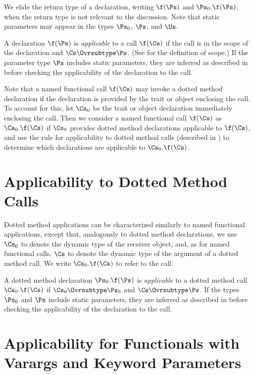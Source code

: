 We elide the return type of a declaration, writing $\f(\Ps)$ and
$\Ps_0.\f(\Ps)$, when the return type is not relevant to the
discussion.
Note that static parameters may appear in the types $\Ps_0$, $\Ps$, and $\Us$.


A declaration $\f(\Ps)$ is \emph{applicable} to a call $\f(\Cs)$
if the call is in the scope of the declaration and $\Cs \Ovrsubtype \Ps$.
(See  for the definition of scope.)
If the parameter type $\Ps$ includes static parameters,
they are inferred as described in 
before checking the applicability of the declaration to the call.



Note that a named functional call $\f(\Cs)$ may invoke a dotted method
declaration if the declaration is provided by the trait or object
enclosing the call.  To account for this, let $\Cs_0$ be the trait or
object declaration immediately enclosing the call.
%
Then we consider a named functional call $\f(\Cs)$ as $\Cs_0.\f(\Cs)$
if $\Cs_0$ provides dotted method declarations applicable to $\f(\Cs)$, and
use the rule for applicability to dotted method calls (described in
) to determine which declarations
are applicable to $\Cs_0.\f(\Cs)$.



\section{Applicability to Dotted Method Calls}

Dotted method applications can be characterized similarly to named
functional applications, except that, analogously to dotted method declarations,
we use $\Cs_0$ to denote the dynamic type of the receiver object,
and, as for named functional calls, $\Cs$ to denote the dynamic
type of the argument of a  dotted method call.
We write $\Cs_0.\f(\Cs)$ to refer to the  call.

A dotted method declaration $\Ps_0.\f(\Ps)$ is \emph{applicable}
to a dotted method call $\Cs_0.\f(\Cs)$ if $\Cs_0 \Ovrsubtype
\Ps_0$ and $\Cs \Ovrsubtype \Ps$.
If the types $\Ps_0$ and $\Ps$ include static parameters,
they are inferred as described in 
before checking the applicability of the declaration to the call.



\section{Applicability for Functionals with Varargs and Keyword Parameters}

